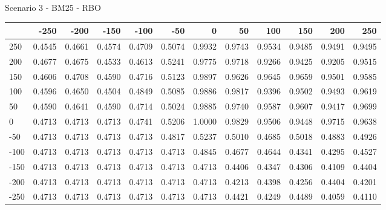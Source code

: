 Scenario 3 - BM25 - RBO
\begin{tabular}{lrrrrrrrrrrr}
\toprule
{} &   -250 &   -200 &   -150 &   -100 &   -50  &    0   &    50  &    100 &    150 &    200 &    250 \\
\midrule
 250 & 0.4545 & 0.4661 & 0.4574 & 0.4709 & 0.5074 & 0.9932 & 0.9743 & 0.9534 & 0.9485 & 0.9491 & 0.9495 \\
 200 & 0.4677 & 0.4675 & 0.4533 & 0.4613 & 0.5241 & 0.9775 & 0.9718 & 0.9266 & 0.9425 & 0.9205 & 0.9515 \\
 150 & 0.4606 & 0.4708 & 0.4590 & 0.4716 & 0.5123 & 0.9897 & 0.9626 & 0.9645 & 0.9659 & 0.9501 & 0.9585 \\
 100 & 0.4596 & 0.4650 & 0.4504 & 0.4849 & 0.5085 & 0.9886 & 0.9817 & 0.9396 & 0.9502 & 0.9493 & 0.9619 \\
 50  & 0.4590 & 0.4641 & 0.4590 & 0.4714 & 0.5024 & 0.9885 & 0.9740 & 0.9587 & 0.9607 & 0.9417 & 0.9699 \\
 0   & 0.4713 & 0.4713 & 0.4713 & 0.4741 & 0.5206 & 1.0000 & 0.9829 & 0.9506 & 0.9448 & 0.9715 & 0.9638 \\
-50  & 0.4713 & 0.4713 & 0.4713 & 0.4713 & 0.4817 & 0.5237 & 0.5010 & 0.4685 & 0.5018 & 0.4883 & 0.4926 \\
-100 & 0.4713 & 0.4713 & 0.4713 & 0.4713 & 0.4713 & 0.4845 & 0.4677 & 0.4644 & 0.4341 & 0.4295 & 0.4527 \\
-150 & 0.4713 & 0.4713 & 0.4713 & 0.4713 & 0.4713 & 0.4713 & 0.4406 & 0.4347 & 0.4306 & 0.4109 & 0.4404 \\
-200 & 0.4713 & 0.4713 & 0.4713 & 0.4713 & 0.4713 & 0.4713 & 0.4213 & 0.4398 & 0.4256 & 0.4404 & 0.4201 \\
-250 & 0.4713 & 0.4713 & 0.4713 & 0.4713 & 0.4713 & 0.4713 & 0.4421 & 0.4249 & 0.4489 & 0.4059 & 0.4110 \\
\bottomrule
\end{tabular}


